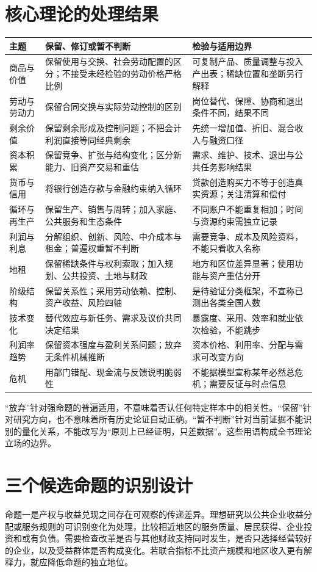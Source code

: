 \documentclass[UTF8,fontset=fandol,zihao=-4,oneside,openany]{ctexbook}
\begin{document}
\section{核心理论的处理结果}
\begin{longtable}{p{27mm}p{61mm}p{55mm}}
\toprule 主题 & 保留、修订或暂不判断 & 检验与适用边界\\\midrule\endhead
商品与价值 & 保留使用与交换、社会劳动配置的区分；不接受未经检验的劳动价格严格比例 & 可复制产品、质量调整与投入产出表；稀缺位置和垄断另行解释\\
劳动与劳动力 & 保留合同交换与实际劳动控制的区别 & 岗位替代、保障、协商和退出条件不同，结果不同\\
剩余价值 & 保留剩余形成及控制问题；不把会计利润直接等同经典剩余 & 先统一增加值、折旧、混合收入与融资口径\\
资本积累 & 保留竞争、扩张与结构变化；区分新能力、旧资产交易和重估 & 需求、维护、技术、退出与公共任务影响结果\\
货币与信用 & 将银行创造存款与金融约束纳入循环 & 贷款创造购买力不等于创造真实资源；关注清算和偿付\\
循环与再生产 & 保留生产、销售与周转；加入家庭、公共服务和生态条件 & 不同账户不能重复相加；时间与资源约束需独立记录\\
利润与利息 & 分解组织、创新、风险、中介成本与租金；普遍权重暂不判断 & 需要竞争、成本及风险资料，不能只看收入名称\\
地租 & 保留稀缺条件与权利索取；加入规划、公共投资、土地与财政 & 地方和区位差异显著；使用功能与资产重估分开\\
阶级结构 & 保留关系性；采用劳动依赖、控制、资产收益、风险四轴 & 是待验证分类框架，不宣称已测出各类全国人数\\
技术变化 & 替代效应与新任务、需求及议价共同决定结果 & 暴露度、采用、效率和就业依次检验，不能跳步\\
利润率趋势 & 保留资本强度与盈利关系问题；放弃无条件机械推断 & 资本价格、利用率、分配与需求可改变方向\\
危机 & 用部门错配、现金流与反馈说明脆弱性 & 不能据模型宣称某年必然总危机；需要反证与时点信息\\
\bottomrule
\end{longtable}

“放弃”针对强命题的普遍适用，不意味着否认任何特定样本中的相关性。“保留”针对研究方向，也不意味着所有历史论证自动正确。“暂不判断”针对当前证据不能识别的量化关系，不能改写为“原则上已经证明，只差数据”。这些用语构成全书理论立场的边界。

\section{三个候选命题的识别设计}
命题一是产权与收益兑现之间存在可观察的传递差异。理想研究以公共企业收益分配或服务规则的可识别变化为处理，比较相近地区的服务质量、居民获得、企业投资和或有负债。需要检查改革是否与其他财政支持同时发生，是否只选择经营较好的企业，以及受益群体是否构成变化。若联合指标不比资产规模和地区收入更有解释力，就应降低命题的独立地位。
\end{document}
